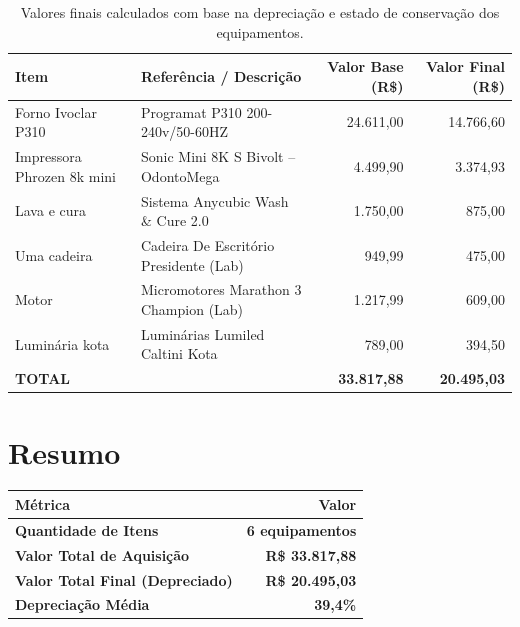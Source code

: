 \documentclass[12pt, a4paper]{article}
\newcommand{\reais}[1]{R\$ #1}
\begin{document}
\begin{table}[H]
    \centering
    \renewcommand{\arraystretch}{1.4}
    \begin{tabularx}{\textwidth}{>{\raggedright\arraybackslash}X >{\raggedright\arraybackslash}p{5.5cm} r r}
        \toprule
        \rowcolor{tableHeader} \textbf{Item} & \textbf{Referência / Descrição} & \textbf{Valor Base (R\$)} & \textbf{Valor Final (R\$)} \\
        \midrule
        Forno Ivoclar P310 & Programat P310 200-240v/50-60HZ & 24.611,00 & 14.766,60 \\
        Impressora Phrozen 8k mini & Sonic Mini 8K S Bivolt -- OdontoMega & 4.499,90 & 3.374,93 \\
        Lava e cura & Sistema Anycubic Wash \& Cure 2.0 & 1.750,00 & 875,00 \\
        Uma cadeira & Cadeira De Escritório Presidente (Lab) & 949,99 & 475,00 \\
        Motor & Micromotores Marathon 3 Champion (Lab) & 1.217,99 & 609,00 \\
        Luminária kota & Luminárias Lumiled Caltini Kota & 789,00 & 394,50 \\
        \midrule
        \rowcolor{lightGray} \textbf{TOTAL} & & \textbf{33.817,88} & \textbf{20.495,03} \\
        \bottomrule
    \end{tabularx}
    \caption*{\footnotesize Valores finais calculados com base na depreciação e estado de conservação dos equipamentos.}
\end{table}

\section{Resumo}

\begin{table}[H]
    \centering
    \large
    \renewcommand{\arraystretch}{1.5}
    \begin{tabularx}{0.85\textwidth}{X r}
        \toprule
        \rowcolor{tableHeader} \textbf{Métrica} & \textbf{Valor} \\
        \midrule
        \textbf{Quantidade de Itens} & \textbf{6 equipamentos} \\
        \textbf{Valor Total de Aquisição} & \textbf{\reais{33.817,88}} \\
        \textbf{Valor Total Final (Depreciado)} & \textbf{\reais{20.495,03}} \\
        \textbf{Depreciação Média} & \textbf{39,4\%} \\
        \bottomrule
    \end{tabularx}
\end{table}
\end{document}
